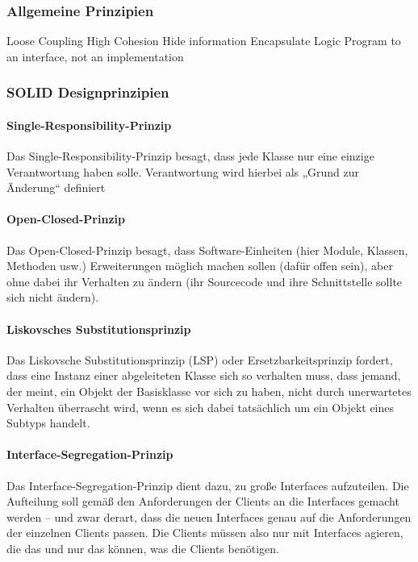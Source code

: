 \subsubsection{Allgemeine Prinzipien}
Loose Coupling
High Cohesion
Hide information
Encapsulate Logic
Program to an interface, not an implementation

\subsubsection{SOLID Designprinzipien}

\paragraph{Single-Responsibility-Prinzip}
Das Single-Responsibility-Prinzip besagt, dass jede Klasse nur eine einzige Verantwortung haben solle. Verantwortung wird hierbei als „Grund zur Änderung“ definiert

\paragraph{Open-Closed-Prinzip}
Das Open-Closed-Prinzip besagt, dass Software-Einheiten (hier Module, Klassen, Methoden usw.) Erweiterungen möglich machen sollen (dafür offen sein), aber ohne dabei ihr Verhalten zu ändern (ihr Sourcecode und ihre Schnittstelle sollte sich nicht ändern).

\paragraph{Liskovsches Substitutionsprinzip}
Das Liskovsche Substitutionsprinzip (LSP) oder Ersetzbarkeitsprinzip fordert, dass eine Instanz einer abgeleiteten Klasse sich so verhalten muss, dass jemand, der meint, ein Objekt der Basisklasse vor sich zu haben, nicht durch unerwartetes Verhalten überrascht wird, wenn es sich dabei tatsächlich um ein Objekt eines Subtyps handelt.

\paragraph{Interface-Segregation-Prinzip}
Das Interface-Segregation-Prinzip dient dazu, zu große Interfaces aufzuteilen. Die Aufteilung soll gemäß den Anforderungen der Clients an die Interfaces gemacht werden – und zwar derart, dass die neuen Interfaces genau auf die Anforderungen der einzelnen Clients passen. Die Clients müssen also nur mit Interfaces agieren, die das und nur das können, was die Clients benötigen.

